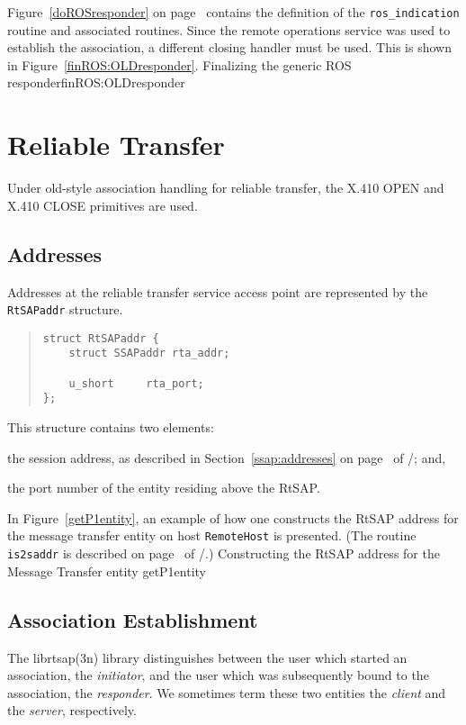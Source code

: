 Figure~\ref{doROSresponder} on page~\pageref{doROSresponder}
contains the definition of the
\verb"ros_indication" routine and associated routines.
Since the remote operations service was used to establish the association,
a different closing handler must be used.
This is shown in Figure~\ref{finROS:OLDresponder}.
{\let\small=\scriptsize			%
%
	{Finalizing the generic ROS responder}{finROS:OLDresponder}}

\section	{Reliable Transfer}\label{rts:old-style}
Under old-style association handling for reliable transfer,
the {\sf X.410 OPEN\/} and {\sf X.410 CLOSE\/} primitives are used.

\subsection	{Addresses}
Addresses at the reliable transfer service access point are represented by the
\verb"RtSAPaddr" structure.
\begin{quote}\small\begin{verbatim}
struct RtSAPaddr {
    struct SSAPaddr rta_addr;

    u_short     rta_port;
};
\end{verbatim}\end{quote}
This structure contains two elements:
\begin{describe}
\item[\verb"rta\_addr":]	the session address,
as described in Section~\ref{ssap:addresses} on page~\pageref{ssap:addresses}
of \voltwo/;
and,

\item[\verb"rta\_port":] the port number of the entity residing above the
RtSAP.
\end{describe}

In Figure~\ref{getP1entity},
an example of how one constructs the RtSAP address for the message transfer
entity on host \verb"RemoteHost" is presented.
(The routine \verb"is2saddr" is described on page~\pageref{ssap:addresses}
of \voltwo/.)
%
        {Constructing the RtSAP address for the Message Transfer entity}%
        {getP1entity}

\subsection       {Association Establishment}
The \man librtsap(3n) library distinguishes between the user which started an
association,
the {\em initiator},
and the user which was subsequently bound to the association,
the {\em responder}.
We sometimes term these two entities the {\em client\/} and the {\em server},
respectively.

